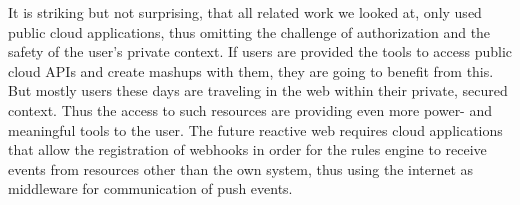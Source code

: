 \documentclass[11pt]{article}%
\begin{document}
It is striking but not surprising, that all related work we looked at, only used public cloud applications, thus omitting the challenge of authorization and the safety of the user's private context.
If users are provided the tools to access public cloud APIs and create mashups with them, they are going to benefit from this. But mostly users these days are traveling in the web within their private, secured context. Thus the access to such resources are providing even more power- and meaningful tools to the user. The future reactive web requires cloud applications that allow the registration of webhooks in order for the rules engine to receive events from resources other than the own system, thus using the internet as middleware for communication of push events.




\newpage
\appendix
\renewcommand\thesection{Appendix \Alph{section}}
\end{document}
